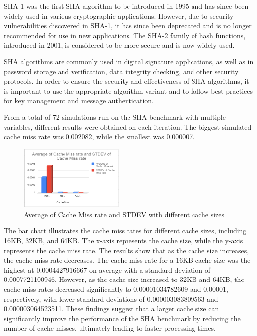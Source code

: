 \documentclass[conference]{IEEEtran}
\begin{document}
SHA-1 was the first SHA algorithm to be introduced in 1995 and has since been widely used in various cryptographic applications. However, due to security vulnerabilities discovered in SHA-1, it has since been deprecated and is no longer recommended for use in new applications. The SHA-2 family of hash functions, introduced in 2001, is considered to be more secure and is now widely used.

SHA algorithms are commonly used in digital signature applications, as well as in password storage and verification, data integrity checking, and other security protocols. In order to ensure the security and effectiveness of SHA algorithms, it is important to use the appropriate algorithm variant and to follow best practices for key management and message authentication.

From a total of 72 simulations run on the SHA benchmark with multiple variables, different results were obtained on each iteration. The biggest simulated cache miss rate was 0.002082, while the smallest was 0.000007.

\begin{figure}[H]
    \centering
    \includegraphics[width=0.45\textwidth]{sha/sha_avg_cachesize.png}
    \caption{Average of Cache Miss rate and STDEV with different cache sizes}
\end{figure}

The bar chart illustrates the cache miss rates for different cache sizes, including 16KB, 32KB, and 64KB. The x-axis represents the cache size, while the y-axis represents the cache miss rate. The results show that as the cache size increases, the cache miss rate decreases. The cache miss rate for a 16KB cache size was the highest at 0.0004427916667 on average with a standard deviation of 0.0007721100946. However, as the cache size increased to 32KB and 64KB, the cache miss rates decreased significantly to 0.00001034782609 and 0.00001, respectively, with lower standard deviations of 0.000003083809563 and 0.000003064523511. These findings suggest that a larger cache size can significantly improve the performance of the SHA benchmark by reducing the number of cache misses, ultimately leading to faster processing times.
\end{document}
